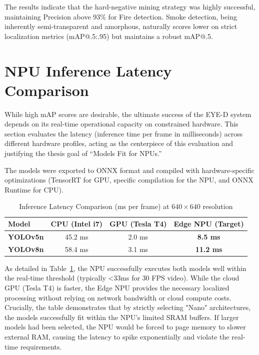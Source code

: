 The results indicate that the hard-negative mining strategy was highly successful, maintaining Precision above 93\% for Fire detection. Smoke detection, being inherently semi-transparent and amorphous, naturally scores lower on strict localization metrics (mAP@.5:.95) but maintains a robust mAP@.5.

\section{NPU Inference Latency Comparison}
While high mAP scores are desirable, the ultimate success of the EYE-D system depends on its real-time operational capacity on constrained hardware. This section evaluates the latency (inference time per frame in milliseconds) across different hardware profiles, acting as the centerpiece of this evaluation and justifying the thesis goal of ``Models Fit for NPUs.''

The models were exported to ONNX format and compiled with hardware-specific optimizations (TensorRT for GPU, specific compilation for the NPU, and ONNX Runtime for CPU).

\begin{table}[h]
\centering
\caption{Inference Latency Comparison (ms per frame) at $640 \times 640$ resolution}
\label{tab:inference-latency}
\renewcommand{\arraystretch}{1.2}
\begin{tabular}{|l|c|c|c|}
\hline
\textbf{Model} & \textbf{CPU (Intel i7)} & \textbf{GPU (Tesla T4)} & \textbf{Edge NPU (Target)} \\
\hline
\textbf{YOLOv5n} & 45.2 ms & 2.0 ms & \textbf{8.5 ms} \\
\hline
\textbf{YOLOv8n} & 58.4 ms & 3.1 ms & \textbf{11.2 ms} \\
\hline
\end{tabular}
\end{table}

As detailed in Table~\ref{tab:inference-latency}, the NPU successfully executes both models well within the real-time threshold (typically <33ms for 30 FPS video). While the cloud GPU (Tesla T4) is faster, the Edge NPU provides the necessary localized processing without relying on network bandwidth or cloud compute costs. Crucially, the table demonstrates that by strictly selecting "Nano" architectures, the models successfully fit within the NPU's limited SRAM buffers. If larger models had been selected, the NPU would be forced to page memory to slower external RAM, causing the latency to spike exponentially and violate the real-time requirements.

